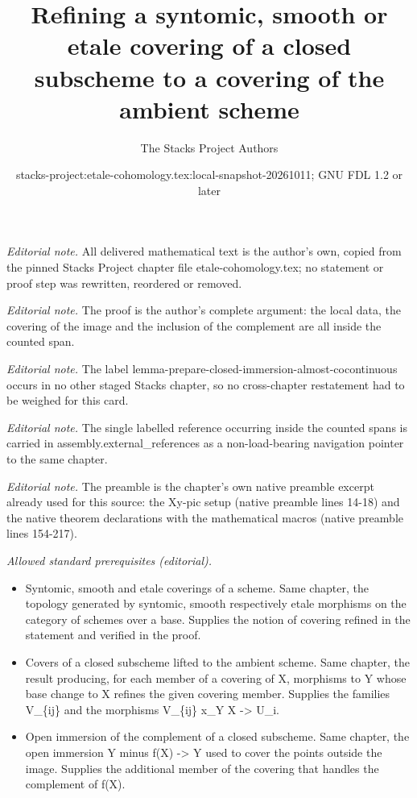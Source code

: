 \documentclass[10pt,a4paper]{amsart}
\title{Refining a syntomic, smooth or etale covering of a closed subscheme to a covering of the ambient scheme}
\author{The Stacks Project Authors}
\date{stacks-project:etale-cohomology.tex:local-snapshot-20261011; GNU FDL 1.2 or later}
\theoremstyle{plain}
\theoremstyle{definition}
\theoremstyle{remark}
\numberwithin{equation}{subsection}
\begin{document}
\maketitle
\noindent\textit{Editorial note.} All delivered mathematical text is the author's own, copied from the pinned Stacks Project chapter file etale-cohomology.tex; no statement or proof step was rewritten, reordered or removed.\par\medskip
\noindent\textit{Editorial note.} The proof is the author's complete argument: the local data, the covering of the image and the inclusion of the complement are all inside the counted span.\par\medskip
\noindent\textit{Editorial note.} The label lemma-prepare-closed-immersion-almost-cocontinuous occurs in no other staged Stacks chapter, so no cross-chapter restatement had to be weighed for this card.\par\medskip
\noindent\textit{Editorial note.} The single labelled reference occurring inside the counted spans is carried in assembly.external\_references as a non-load-bearing navigation pointer to the same chapter.\par\medskip
\noindent\textit{Editorial note.} The preamble is the chapter's own native preamble excerpt already used for this source: the Xy-pic setup (native preamble lines 14-18) and the native theorem declarations with the mathematical macros (native preamble lines 154-217).\par\medskip
\noindent\textit{Allowed standard prerequisites (editorial).}\begin{itemize}
\item Syntomic, smooth and etale coverings of a scheme. Same chapter, the topology generated by syntomic, smooth respectively etale morphisms on the category of schemes over a base. Supplies the notion of covering refined in the statement and verified in the proof.
\item Covers of a closed subscheme lifted to the ambient scheme. Same chapter, the result producing, for each member of a covering of X, morphisms to Y whose base change to X refines the given covering member. Supplies the families V\_\{ij\} and the morphisms V\_\{ij\} x\_Y X -> U\_i.
\item Open immersion of the complement of a closed subscheme. Same chapter, the open immersion Y minus f(X) -> Y used to cover the points outside the image. Supplies the additional member of the covering that handles the complement of f(X).
\end{itemize}\medskip
\end{document}
